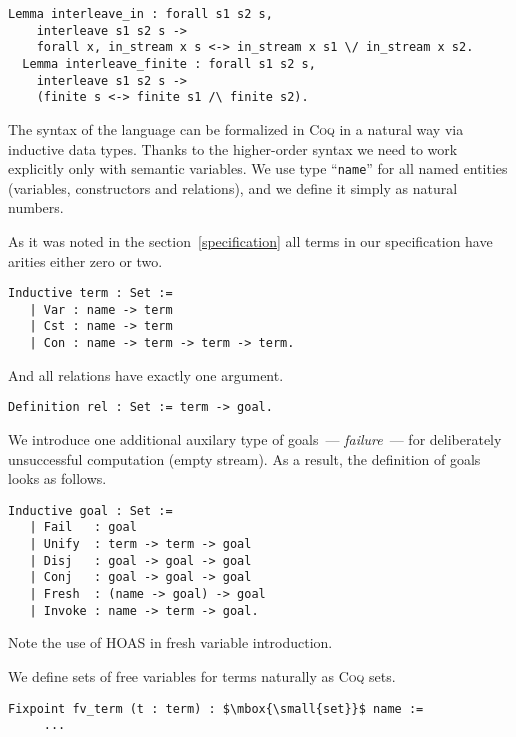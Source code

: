 \begin{lstlisting}[language=Coq]
  Lemma interleave_in : forall s1 s2 s,
    interleave s1 s2 s ->
    forall x, in_stream x s <-> in_stream x s1 \/ in_stream x s2.
  Lemma interleave_finite : forall s1 s2 s,
    interleave s1 s2 s ->
    (finite s <-> finite s1 /\ finite s2).
\end{lstlisting}

The syntax of the language can be formalized in \textsc{Coq} in a natural way via inductive data types. Thanks to the higher-order syntax we need to work explicitly only with semantic variables. We use type ``\lstinline[language=Coq]{name}'' for all named entities (variables, constructors and relations), and we define it simply as natural numbers.

As it was noted in the section~\ref{specification} all terms in our specification have arities either zero or two.

\begin{lstlisting}[language=Coq] 
   Inductive term : Set :=
   | Var : name -> term
   | Cst : name -> term
   | Con : name -> term -> term -> term.
\end{lstlisting}

And all relations have exactly one argument.

\begin{lstlisting}[language=Coq]
   Definition rel : Set := term -> goal.
\end{lstlisting}

We introduce one additional auxilary type of goals~--- \emph{failure}~--- for deliberately unsuccessful computation (empty stream). As a result, the definition of goals looks as follows.

\begin{lstlisting}[language=Coq] 
   Inductive goal : Set :=
   | Fail   : goal
   | Unify  : term -> term -> goal
   | Disj   : goal -> goal -> goal
   | Conj   : goal -> goal -> goal
   | Fresh  : (name -> goal) -> goal
   | Invoke : name -> term -> goal.
\end{lstlisting}

Note the use of HOAS in fresh variable introduction.

We define sets of free variables for terms naturally as \textsc{Coq} sets.

\begin{lstlisting}[language=Coq,mathescape=true] 
   Fixpoint fv_term (t : term) : $\mbox{\small{set}}$ name :=
     ...
\end{lstlisting}


